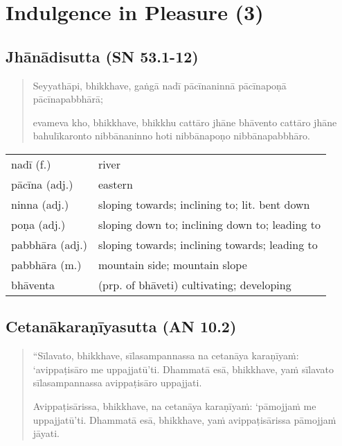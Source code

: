 \documentclass[11pt,oneside]{memoir}
\begin{document}
\normalArrayStrech

\chapter{Indulgence in Pleasure (3)}
\label{sec:org5e2cf2d}
\section{Jhānādisutta (SN 53.1-12)}
\label{sec:orge5d0583}

\begin{quote}
Seyyathāpi, bhikkhave, gaṅgā nadī pācīnaninnā pācīnapoṇā pācīnapabbhārā;

evameva kho, bhikkhave, bhikkhu cattāro jhāne bhāvento cattāro jhāne
bahulīkaronto nibbānaninno hoti nibbānapoṇo nibbānapabbhāro.
\end{quote}

\begin{longtable}{L{\colOne} L{\colTwo}}
nadī (f.) & river\\[0pt]
pācīna (adj.) & eastern\\[0pt]
ninna (adj.) & sloping towards; inclining to; lit. bent down\\[0pt]
poṇa (adj.) & sloping down to; inclining down to; leading to\\[0pt]
pabbhāra (adj.) & sloping towards; inclining towards; leading to\\[0pt]
pabbhāra (m.) & mountain side; mountain slope\\[0pt]
bhāventa & (prp. of bhāveti) cultivating; developing\\[0pt]
\end{longtable}

\section{Cetanākaraṇīyasutta (AN 10.2)}
\label{sec:orgb16522b}

\begin{quote}
“Sīlavato, bhikkhave, sīlasampannassa na cetanāya karaṇīyaṁ: ‘avippaṭisāro me
uppajjatū’ti. Dhammatā esā, bhikkhave, yaṁ sīlavato sīlasampannassa avippaṭisāro
uppajjati.

Avippaṭisārissa, bhikkhave, na cetanāya karaṇīyaṁ: ‘pāmojjaṁ me uppajjatū’ti.
Dhammatā esā, bhikkhave, yaṁ avippaṭisārissa pāmojjaṁ jāyati.
\end{quote}
\end{document}
